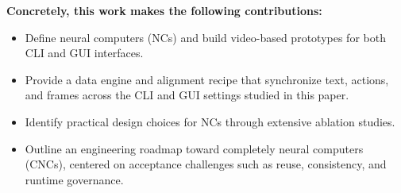 \textbf{Concretely, this work makes the following contributions:}
{
\renewcommand\labelitemi{\large$\bullet$}
\begin{itemize}
\setlength{\itemsep}{2pt plus 1pt minus 1pt}
\setlength{\parskip}{0pt}
\item Define neural computers (NCs) and build video-based prototypes for both CLI and GUI interfaces.
\item Provide a data engine and alignment recipe that synchronize text, actions, and frames across the CLI and GUI settings studied in this paper.
\item Identify practical design choices for NCs through extensive ablation studies.
\item Outline an engineering roadmap toward completely neural computers (CNCs), centered on acceptance challenges such as reuse, consistency, and runtime governance.

\end{itemize}
}
